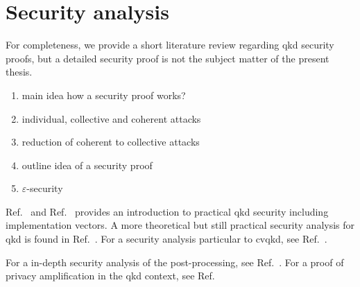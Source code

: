 \section{Security analysis}

For completeness, we provide a short literature review regarding \gls{qkd} security proofs, but a detailed security proof is not the subject matter of the present thesis.

\begin{enumerate}
	\item main idea how a security proof works?
	\item individual, collective and coherent attacks
	\item reduction of coherent to collective attacks~\cite{Renner2009}
	\item outline idea of a security proof
	\item $\varepsilon$-security
\end{enumerate}

Ref.~\cite{Lo2014} and Ref.~\cite{Laudenbach2018} provides an introduction to practical \gls{qkd} security including implementation vectors.
A more theoretical but still practical security analysis for \gls{qkd} is found in Ref.~\cite{Scarani2009}.
For a security analysis particular to \gls{cvqkd}, see Ref.~\cite{Diamanti2015}.

For a in-depth security analysis of the post-processing, see Ref.~\cite{Fung2010}.
For a proof of privacy amplification in the \gls{qkd} context, see Ref.~\cite{Renner2005}